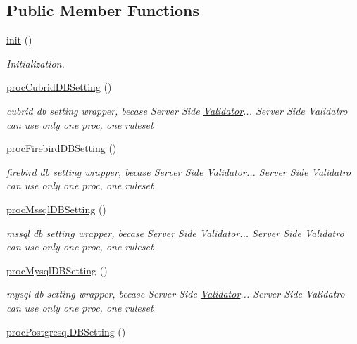\subsection*{Public Member Functions}
\begin{DoxyCompactItemize}
\item 
\hyperlink{classinstallController_a99641d12063ae41f5a787ac159853c83}{init} ()
\begin{DoxyCompactList}\small\item\em Initialization. \end{DoxyCompactList}\item 
\hyperlink{classinstallController_a275ce5057c0171e2582739506cec99cb}{proc\+Cubrid\+D\+B\+Setting} ()
\begin{DoxyCompactList}\small\item\em cubrid db setting wrapper, becase Server Side \hyperlink{classValidator}{Validator}... Server Side Validatro can use only one proc, one ruleset \end{DoxyCompactList}\item 
\hyperlink{classinstallController_a243cf71fa5653d7cbf2d5583effefb95}{proc\+Firebird\+D\+B\+Setting} ()
\begin{DoxyCompactList}\small\item\em firebird db setting wrapper, becase Server Side \hyperlink{classValidator}{Validator}... Server Side Validatro can use only one proc, one ruleset \end{DoxyCompactList}\item 
\hyperlink{classinstallController_a583b9b74e93bf6a762a7bd6d08e2b23a}{proc\+Mssql\+D\+B\+Setting} ()
\begin{DoxyCompactList}\small\item\em mssql db setting wrapper, becase Server Side \hyperlink{classValidator}{Validator}... Server Side Validatro can use only one proc, one ruleset \end{DoxyCompactList}\item 
\hyperlink{classinstallController_a9d46a8423a90109be5dc1edf8238630e}{proc\+Mysql\+D\+B\+Setting} ()
\begin{DoxyCompactList}\small\item\em mysql db setting wrapper, becase Server Side \hyperlink{classValidator}{Validator}... Server Side Validatro can use only one proc, one ruleset \end{DoxyCompactList}\item 
\hyperlink{classinstallController_afc3f4c6259e4be427531fca748c98c49}{proc\+Postgresql\+D\+B\+Setting} ()

\end{DoxyCompactItemize}
